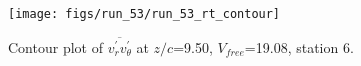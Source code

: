 \begin{figure}[H]
\centering
\texttt{[image: figs/run\_53/run\_53\_rt\_contour]}
\caption{Contour plot of $\overline{v_{r}^{\prime} v_{\theta}^{\prime}}$ at $z/c$=9.50, $V_{free}$=19.08, station 6.}
\label{fig:run_53_rt_contour}
\end{figure}


